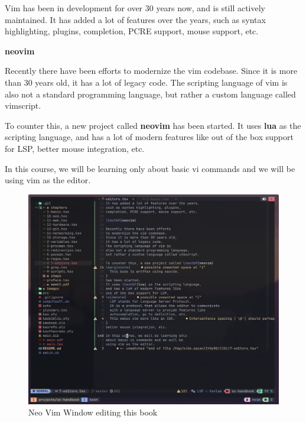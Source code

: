 Vim has been in development for over 30 years now,
and is still actively maintained.
It has added a lot of features over the years,
such as syntax highlighting, plugins,
completion, PCRE support, mouse support, etc.

\textbf{neovim}

Recently there have been efforts
to modernize the vim codebase.
Since it is more than 30 years old,
it has a lot of legacy code.
The scripting language of vim is
also not a standard programming language,
but rather a custom language called vimscript.

To counter this, a new project called \textbf{neovim}
has been started.
It uses \textbf{lua} as the scripting language,
and has a lot of modern features like
out of the box support for LSP,
better mouse integration, etc.

In this course, we will be learning only
about basic vi commands and we will be
using vim as the editor.

\begin{figure}[h!]
  \includegraphics{images/png/nvim.png}
  \caption{Neo Vim Window editing this book}
\end{figure}


